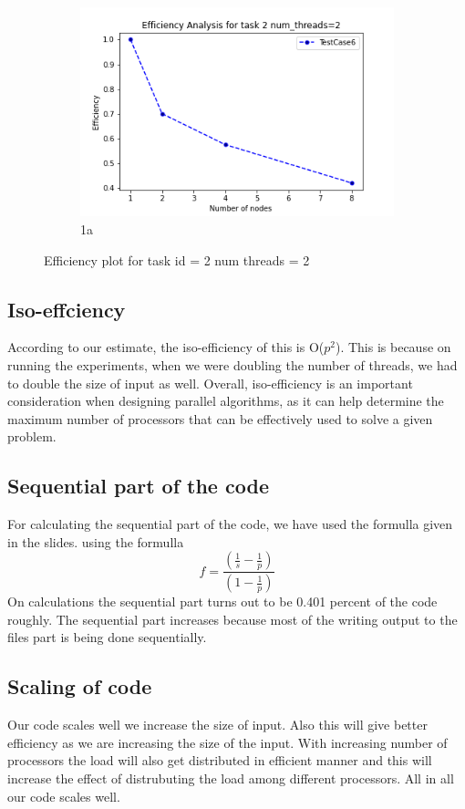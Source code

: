 \documentclass{article}
\begin{document}
\begin{figure}[H]
\begin{subfigure}{.8\textwidth}
  \centering
  \includegraphics[width=.8\linewidth]{Assignment3/report/2eff-threads=2.png}
  \caption{1a}
  \label{fig:sfig1}
\end{subfigure}%
\caption{Efficiency plot for task id = 2 num threads = 2}
\label{fig:fig}
\end{figure}



\subsection{Iso-effciency}
According to our estimate, the iso-efficiency of this is O($p^2$). This is because on running the experiments, when we were doubling the number of threads, we had to double the size of input as well. Overall, iso-efficiency is an important consideration when designing parallel algorithms, as it can help determine the maximum number of processors that can be effectively used to solve a given problem.

\subsection{Sequential part of the code}
For calculating the sequential part of the code, we have used the formulla given in the slides. using the formulla 
\begin{equation}
    f  = \frac{(\frac{1}{s} - \frac{1}{p})}{(1-\frac{1}{p})}
\end{equation}
On calculations the sequential part turns out to be 0.401 percent of the code roughly. The sequential part increases because most of the writing output to the files part is being done sequentially.

\subsection{Scaling of code}
Our code scales well we increase the size of input. Also this will give better efficiency as we are increasing the size of the input. With increasing number of processors the load will also get distributed in efficient manner and this will increase the effect of distrubuting the load among different processors. All in all our code scales well.
\end{document}
